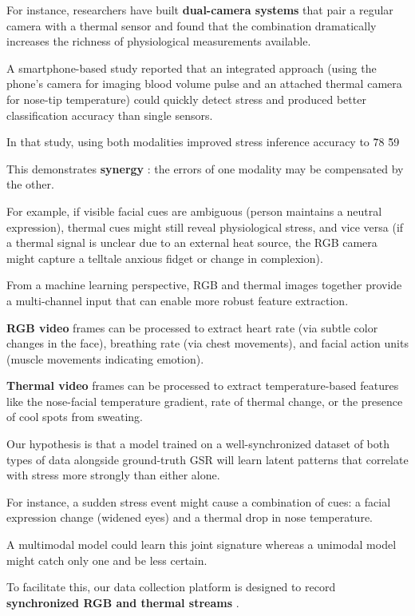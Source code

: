 For instance, researchers have built \textbf{dual-camera systems}
that pair a regular camera with a thermal sensor and found that the combination
dramatically increases the richness of physiological measurements available.

A smartphone-based study reported that an integrated approach (using the phone's
camera for imaging blood volume pulse and an attached thermal camera for
nose-tip temperature) could quickly detect stress and produced better
classification accuracy than single sensors.

In that study, using both modalities improved stress inference accuracy to
\~78%
\~59%

This demonstrates \textbf{synergy}
: the errors of one modality may be compensated by the other.

For example, if visible facial cues are ambiguous (person maintains a neutral
expression), thermal cues might still reveal physiological stress, and vice
versa (if a thermal signal is unclear due to an external heat source, the RGB
camera might capture a telltale anxious fidget or change in complexion).

From a machine learning perspective, RGB and thermal images together provide a
multi-channel input that can enable more robust feature extraction.

\textbf{RGB video}
frames can be processed to extract heart rate (via subtle color changes in the
face), breathing rate (via chest movements), and facial action units (muscle
movements indicating emotion).

\textbf{Thermal video}
frames can be processed to extract temperature-based features like the
nose-facial temperature gradient, rate of thermal change, or the presence of
cool spots from sweating.

Our hypothesis is that a model trained on a well-synchronized dataset of both
types of data alongside ground-truth GSR will learn latent patterns that
correlate with stress more strongly than either alone.

For instance, a sudden stress event might cause a combination of cues: a facial
expression change (widened eyes) and a thermal drop in nose temperature.

A multimodal model could learn this joint signature whereas a unimodal model
might catch only one and be less certain.

To facilitate this, our data collection platform is designed to record \textbf{synchronized RGB and thermal streams}
.

